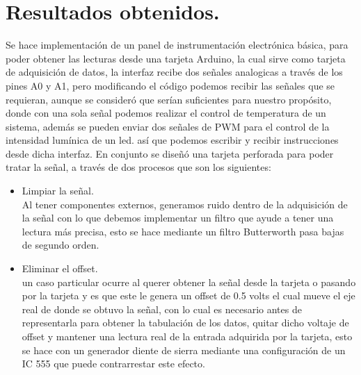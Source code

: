 \documentclass[a4paper,12pt]{article}
\begin{document}
    \section{Resultados obtenidos.}
    \noindent Se hace implementación de un panel de instrumentación electrónica básica, para poder obtener las lecturas desde una tarjeta Arduino, la cual sirve como tarjeta de adquisición de datos, la interfaz recibe dos señales analogicas a través de los pines A0 y A1, pero modificando el código podemos recibir las señales que se requieran, aunque se consideró que serían suficientes para nuestro propósito, donde con una sola señal podemos realizar el control de temperatura de un sistema,  además se pueden enviar dos señales de PWM para el control de la intensidad lumínica de un led. así que podemos escribir y recibir instrucciones desde dicha interfaz.
    En conjunto se diseñó una tarjeta perforada para poder tratar la señal, a través de dos procesos que son los siguientes:
    \begin{itemize}
        \item Limpiar la señal.\\
        Al tener componentes externos, generamos ruido dentro de la adquisición de la señal con lo que debemos implementar un filtro que ayude a tener una lectura más precisa, esto se hace mediante un filtro Butterworth pasa bajas de segundo orden. 
        
        \item Eliminar el offset.\\
        un caso particular ocurre al querer obtener la señal desde la tarjeta o pasando por la tarjeta y es que este le genera un offset de 0.5 volts el cual mueve el eje real de donde se obtuvo la señal, con lo cual es necesario antes de representarla para obtener la tabulación de los datos, quitar dicho voltaje de offset y mantener una lectura real de la entrada adquirida por la tarjeta, esto se hace con un generador diente de sierra mediante una configuración de un IC 555 que puede contrarrestar este efecto. 
    \end{itemize}
    
\end{document}
